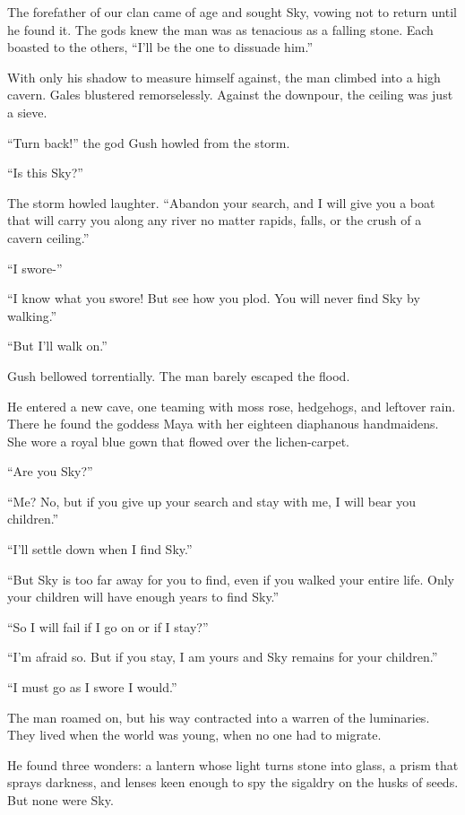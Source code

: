 
The forefather of our clan came of age and sought Sky, vowing not to
return until he found it. The gods knew the man was as tenacious as a
falling stone. Each boasted to the others, ``I'll be the one to dissuade
him.''

With only his shadow to measure himself against, the man climbed into a
high cavern. Gales blustered remorselessly. Against the downpour, the
ceiling was just a sieve.

``Turn back!'' the god Gush howled from the storm.

``Is this Sky?''

The storm howled laughter. ``Abandon your search, and I will give you a
boat that will carry you along any river no matter rapids, falls, or the
crush of a cavern ceiling.''

``I swore-''

``I know what you swore! But see how you plod. You will never find Sky
by walking.''

``But I'll walk on.''

Gush bellowed torrentially. The man barely escaped the flood.

He entered a new cave, one teaming with moss rose, hedgehogs, and
leftover rain. There he found the goddess Maya with her eighteen
diaphanous handmaidens. She wore a royal blue gown that flowed over the
lichen-carpet.

``Are you Sky?''

``Me? No, but if you give up your search and stay with me, I will bear
you children.''

``I'll settle down when I find Sky.''

``But Sky is too far away for you to find, even if you walked your
entire life. Only your children will have enough years to find Sky.''

``So I will fail if I go on or if I stay?''

``I'm afraid so. But if you stay, I am yours and Sky remains for your
children.''

``I must go as I swore I would.''

The man roamed on, but his way contracted into a warren of the
luminaries. They lived when the world was young, when no one had to
migrate.

He found three wonders: a lantern whose light turns stone into glass, a
prism that sprays darkness, and lenses keen enough to spy the sigaldry
on the husks of seeds. But none were Sky.

